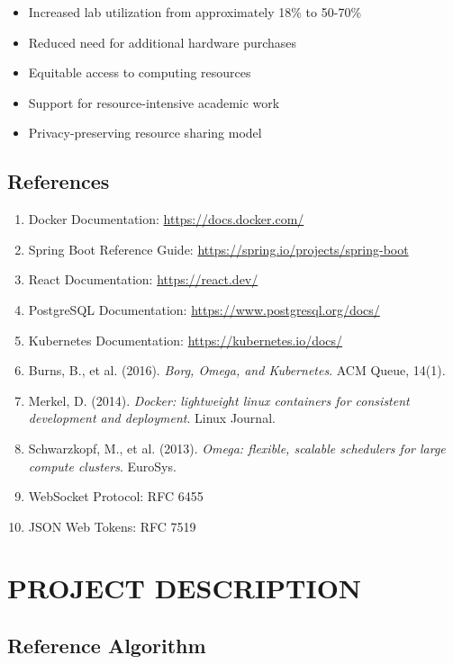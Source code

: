 \documentclass[12pt,a4paper]{article}
\begin{document}
\begin{itemize}
    \item Increased lab utilization from approximately 18\% to 50-70\%
    \item Reduced need for additional hardware purchases
    \item Equitable access to computing resources
    \item Support for resource-intensive academic work
    \item Privacy-preserving resource sharing model
\end{itemize}

\subsection{References}
\label{sec:references}

\begin{enumerate}
    \item Docker Documentation: \url{https://docs.docker.com/}
    \item Spring Boot Reference Guide: \url{https://spring.io/projects/spring-boot}
    \item React Documentation: \url{https://react.dev/}
    \item PostgreSQL Documentation: \url{https://www.postgresql.org/docs/}
    \item Kubernetes Documentation: \url{https://kubernetes.io/docs/}
    \item Burns, B., et al. (2016). \textit{Borg, Omega, and Kubernetes}. ACM Queue, 14(1).
    \item Merkel, D. (2014). \textit{Docker: lightweight linux containers for consistent development and deployment}. Linux Journal.
    \item Schwarzkopf, M., et al. (2013). \textit{Omega: flexible, scalable schedulers for large compute clusters}. EuroSys.
    \item WebSocket Protocol: RFC 6455
    \item JSON Web Tokens: RFC 7519
\end{enumerate}

\newpage
\section{PROJECT DESCRIPTION}
\label{sec:description}

\subsection{Reference Algorithm}
\label{sec:algorithm}
\end{document}
